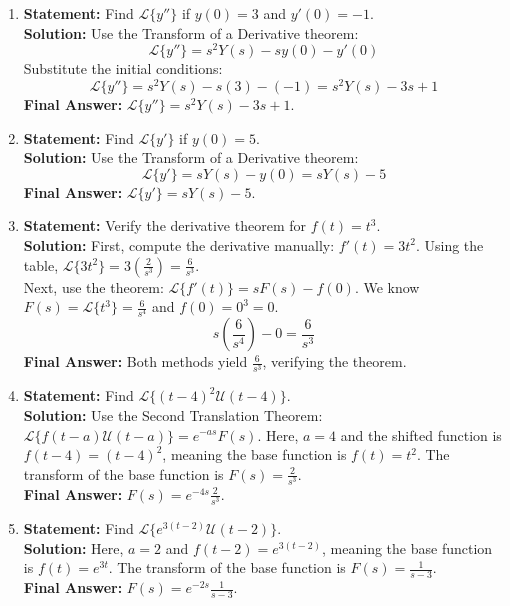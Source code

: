 \documentclass[11pt, letterpaper]{article}
\theoremstyle{definition}
\theoremstyle{remark}
\begin{document}
\begin{enumerate}[label=\textbf{Solution \arabic*.}, leftmargin=*]
    \item \textbf{Statement:} Find $\mathscr{L}\{y''\}$ if $y(0) = 3$ and $y'(0) = -1$.\\
    \textbf{Solution:} Use the Transform of a Derivative theorem:
    \[
    \mathscr{L}\{y''\} = s^2 Y(s) - sy(0) - y'(0)
    \]
    Substitute the initial conditions:
    \[
    \mathscr{L}\{y''\} = s^2 Y(s) - s(3) - (-1) = s^2 Y(s) - 3s + 1
    \]
    \textbf{Final Answer:} $\mathscr{L}\{y''\} = s^2 Y(s) - 3s + 1$.

    \item \textbf{Statement:} Find $\mathscr{L}\{y'\}$ if $y(0) = 5$.\\
    \textbf{Solution:} Use the Transform of a Derivative theorem:
    \[
    \mathscr{L}\{y'\} = s Y(s) - y(0) = s Y(s) - 5
    \]
    \textbf{Final Answer:} $\mathscr{L}\{y'\} = s Y(s) - 5$.

    \item \textbf{Statement:} Verify the derivative theorem for $f(t) = t^3$.\\
    \textbf{Solution:} First, compute the derivative manually: $f'(t) = 3t^2$. Using the table, $\mathscr{L}\{3t^2\} = 3\left(\frac{2}{s^3}\right) = \frac{6}{s^3}$.\\
    Next, use the theorem: $\mathscr{L}\{f'(t)\} = sF(s) - f(0)$. We know $F(s) = \mathscr{L}\{t^3\} = \frac{6}{s^4}$ and $f(0) = 0^3 = 0$.
    \[
    s\left(\frac{6}{s^4}\right) - 0 = \frac{6}{s^3}
    \]
    \textbf{Final Answer:} Both methods yield $\frac{6}{s^3}$, verifying the theorem.

    \item \textbf{Statement:} Find $\mathscr{L}\{(t-4)^2 \mathcal{U}(t-4)\}$.\\
    \textbf{Solution:} Use the Second Translation Theorem: $\mathscr{L}\{f(t-a)\mathcal{U}(t-a)\} = e^{-as}F(s)$. Here, $a = 4$ and the shifted function is $f(t-4) = (t-4)^2$, meaning the base function is $f(t) = t^2$. The transform of the base function is $F(s) = \frac{2}{s^3}$.\\
    \textbf{Final Answer:} $F(s) = e^{-4s} \frac{2}{s^3}$.

    \item \textbf{Statement:} Find $\mathscr{L}\{e^{3(t-2)} \mathcal{U}(t-2)\}$.\\
    \textbf{Solution:} Here, $a = 2$ and $f(t-2) = e^{3(t-2)}$, meaning the base function is $f(t) = e^{3t}$. The transform of the base function is $F(s) = \frac{1}{s-3}$.\\
    \textbf{Final Answer:} $F(s) = e^{-2s} \frac{1}{s-3}$.


\end{enumerate}
\end{document}
